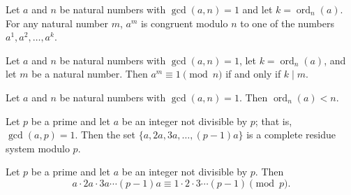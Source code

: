 \documentclass{article}
\theoremstyle{definition}
\newenvironment{manualtheorem}[1]{%
  \renewcommand{\thetheorem}{#1}%
  \theorem%
}{%
  \endtheorem%
}
\begin{document}
\begin{manualtheorem}{4.9}
	Let $a$ and $n$ be natural numbers with $\gcd(a,n) = 1$ and let $k = \operatorname{ord}_{n}(a)$. For any natural number $m$, $a^{m}$ is congruent modulo $n$ to one of the numbers $a^{1}, a^{2}, \ldots, a^{k}$.

\end{manualtheorem}

\begin{manualtheorem}{4.10}
	Let $a$ and $n$ be natural numbers with $\gcd(a,n) = 1$, let $k = \operatorname{ord}_{n}(a)$, and let $m$ be a natural number. Then $a^{m} \equiv 1 \pmod{n}$ if and only if $k \mid m$.
\end{manualtheorem}

\begin{manualtheorem}{4.11}
	Let $a$ and $n$ be natural numbers with $\gcd(a,n) = 1$. Then $\operatorname{ord}_{n}(a) < n$.
\end{manualtheorem}

\begin{manualtheorem}{4.13}
	Let $p$ be a prime and let $a$ be an integer not divisible by $p$; that is, $\gcd(a,p) = 1$. Then the set $\{a, 2a, 3a, \ldots, (p-1)a\}$ is a complete residue system modulo $p$.

\end{manualtheorem}

\begin{manualtheorem}{4.14}
	Let $p$ be a prime and let $a$ be an integer not divisible by $p$. Then
	\[
		a \cdot 2a \cdot 3a \cdots (p-1)a \equiv 1 \cdot 2 \cdot 3 \cdots (p-1) \pmod{p}.
	\]
\end{manualtheorem}
\end{document}
